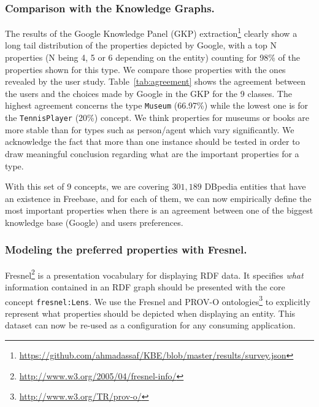\subsubsection{Comparison with the Knowledge Graphs.}
\label{sec:comparison}
The results of the Google Knowledge Panel (GKP) extraction\footnote{\url{https://github.com/ahmadassaf/KBE/blob/master/results/survey.json}} clearly show a long tail distribution of the properties depicted by Google, with a top N properties (N being 4, 5 or 6 depending on the entity) counting for 98\% of the properties shown for this type. We compare those properties with the ones revealed by the user study. Table~\ref{tab:agreement} shows the agreement between the users and the choices made by Google in the GKP for the 9 classes. The highest agreement concerns the type \texttt{Museum} (66.97\%) while the lowest one is for the \texttt{TennisPlayer} (20\%) concept. We think properties for museums or books are more stable than for types such as person/agent which vary significantly. We acknowledge the fact that more than one instance should be tested in order to draw meaningful conclusion regarding what are the important properties for a type.

\begin{table}[!htp]
\end{table}\normalsize

With this set of 9 concepts, we are covering $301,189$ DBpedia entities that have an existence in Freebase, and for each of them, we can now empirically define the most important properties when there is an agreement between one of the biggest knowledge base (Google) and users preferences.

\subsubsection{Modeling the preferred properties with Fresnel.}
\label{sec:fresnel}
Fresnel\footnote{\url{http://www.w3.org/2005/04/fresnel-info/}} is a presentation vocabulary for displaying RDF data. It specifies \textit{what} information contained in an RDF graph should be presented with the core concept \texttt{fresnel:Lens}. We use the Fresnel and PROV-O ontologies\footnote{\url{http://www.w3.org/TR/prov-o/}} to explicitly represent what properties should be depicted when displaying an entity. This dataset can now be re-used as a configuration for any consuming application.

